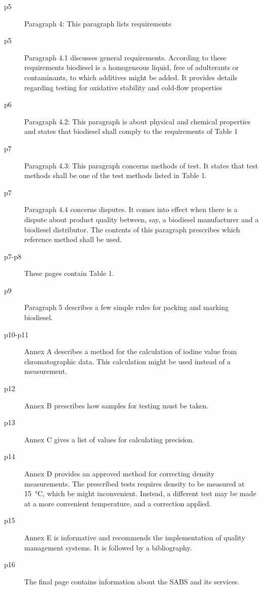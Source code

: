 \begin{description}
\item[p5]{Paragraph 4: This paragraph lists requirements} 

\item[p5]{Paragraph 4.1 discusses general requirements. According to these
requirements biodiesel is a homogeneous liquid, free of adulterants or
contaminants, to which additives might be added. It provides details regarding
testing for oxidative stability and cold-flow properties}

\item[p6]{Paragraph 4.2: This paragraph is about physical and chemical
properties and states that biodiesel shall comply to the requirements of Table
1}

\item[p7]{Paragraph 4.3: This paragraph concerns methods of test. It states that
test methods shall be  one of the test methods listed in Table 1.}

\item[p7]{Paragraph 4.4 concerns disputes. It comes into effect when there is a
dispute about product quality between, say, a biodiesel manufacturer and a
biodiesel distributor. The contents of this paragraph prescribes which reference
method shall be used.}

\item[p7-p8]{These pages contain Table 1.}

\item[p9]{Paragraph 5 describes a few simple rules for packing and marking biodiesel.}

\item[p10-p11]{Annex A describes a method for the calculation of iodine value
from chromatographic data. This calculation might be used instead of a
measurement.}

\item[p12]{Annex B prescribes how samples for testing must be taken.}

\item[p13]{Annex C gives a list of values for calculating precision.}

\item[p14]{Annex D provides an approved method for correcting density
measurements. The prescribed tests requires density to be measured at
\SI{15}{\celsius}, which be might inconvenient. Instead, a different test may be
made at a more convenient temperature, and a correction applied. }

\item[p15]{Annex E is informative and recommends the implementation of quality
management systems. It is followed by a bibliography.}

\item[p16]{The final page contains information about the SABS and its services.}

\end{description} 

